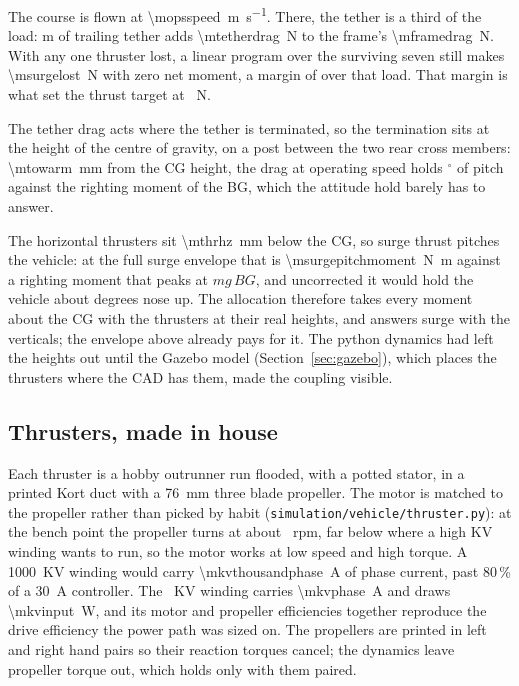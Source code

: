 \documentclass[10pt,a4paper]{article}
\begin{document}
The course is flown at \SI{\mopsspeed}{\metre\per\second}. There, the tether
is a third of the load: \mtrail{} m of trailing tether adds
\SI{\mtetherdrag}{\newton} to the frame's \SI{\mframedrag}{\newton}. With any
one thruster lost, a linear program over the surviving seven still makes
\SI{\msurgelost}{\newton} with zero net moment, a margin of \mopsmargin{} over
that load. That margin is what set the thrust target at \mthrustmax{}~N.

The tether drag acts where the tether is terminated, so the termination sits
at the height of the centre of gravity, on a post between the two rear cross
members: \SI{\mtowarm}{\milli\metre} from the CG height, the drag at operating
speed holds \mtowpitch$^\circ$ of pitch against the righting moment of the
BG, which the attitude hold barely has to answer.

The horizontal thrusters sit \SI{\mthrhz}{\milli\metre} below the CG, so
surge thrust pitches the vehicle: at the full surge envelope that is
\SI{\msurgepitchmoment}{\newton\metre} against a righting moment that peaks at
$m g\,BG$, and uncorrected it would hold the vehicle about \msurgepitchdeg{}
degrees nose up. The allocation therefore takes every moment about the CG with
the thrusters at their real heights, and answers surge with the verticals; the
envelope above already pays for it. The python dynamics had left the heights
out until the Gazebo model (Section~\ref{sec:gazebo}), which places the
thrusters where the CAD has them, made the coupling visible.

\subsection{Thrusters, made in house}

Each thruster is a hobby outrunner run flooded, with a potted stator, in a
printed Kort duct with a \SI{76}{\milli\metre} three blade propeller. The
motor is matched to the propeller rather than picked by habit
(\texttt{simulation/vehicle/thruster.py}): at the bench point the propeller turns at about
\mkvrpm{}~rpm, far below where a high KV winding wants to run, so the motor
works at low speed and high torque. A 1000~KV winding would carry
\SI{\mkvthousandphase}{\ampere} of phase current, past 80\,\% of a
\SI{30}{\ampere} controller. The \mkvchosen{}~KV winding carries
\SI{\mkvphase}{\ampere} and draws \SI{\mkvinput}{\watt}, and its motor and
propeller efficiencies together reproduce the drive efficiency the power path
was sized on. The propellers are printed in left and right hand pairs so their
reaction torques cancel; the dynamics leave propeller torque out, which holds
only with them paired.
\end{document}
